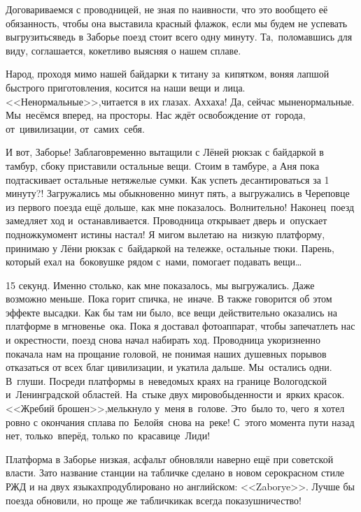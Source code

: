 Договариваемся с проводницей, не зная по наивности, что это вообще\sdash то её обязанность, чтобы она выставила красный флажок, если мы будем не успевать выгрузиться\mdash ведь в Заборье поезд стоит всего одну минуту. Та,~поломавшись для виду, соглашается, кокетливо выясняя о нашем сплаве. 

Народ, проходя мимо нашей байдарки к титану за~кипятком, воняя лапшой быстрого приготовления, косится на наши вещи и лица.  <<Ненормальные>>,\mdash читается в их глазах. Ах\sdash ха\sdash ха! Да, сейчас мы\mdash ненормальные. Мы~несёмся вперед, на просторы. Нас ждёт освобождение от~города, от~цивилизации, от~самих~себя.

И вот, Заборье! Заблаговременно вытащили с Лёней рюкзак с байдаркой в тамбур, сбоку приставили остальные вещи. Стоим в тамбуре, а Аня пока подтаскивает остальные нетяжелые сумки. Как успеть десантироваться за 1 минуту?! Загружались мы обыкновенно минут пять, а выгружались в Череповце из первого поезда ещё дольше, как мне показалось. Волнительно! Наконец~поезд замедляет ход и~останавливается. Проводница открывает дверь и~опускает подножку\mdash момент истины настал! Я мигом вылетаю на~низкую платформу, принимаю у Лёни рюкзак с~байдаркой на тележке, остальные тюки. Парень, который ехал на~боковушке рядом с~нами, помогает подавать вещи\ldots~

15 секунд. Именно столько, как мне показалось, мы выгружались. Даже возможно меньше. Пока горит спичка, не~иначе. В \cite{Квадригин} также говорится об этом эффекте высадки. Как бы там ни было, все вещи действительно оказались на платформе в мгновенье~ока. Пока я доставал фотоаппарат, чтобы запечатлеть нас и окрестности, поезд снова начал набирать ход. Проводница укоризненно покачала нам на прощание головой, не понимая наших душевных порывов отказаться от всех благ цивилизации, и укатила дальше. Мы~остались одни. В~глуши. Посреди платформы в~неведомых краях на границе Вологодской и~Ленинградской областей. На~стыке двух миров\mdash обыденности и~ярких красок. <<Жребий брошен>>,\mdash мелькнуло у~меня в~голове. Это~было то, чего~я хотел ровно с окончания сплава по~Белой\mdash я~снова на~реке! С~этого момента пути назад нет, только~вперёд, только по~красавице~Лиди!

Платформа в Заборье низкая, асфальт обновляли наверно ещё при советской власти. Зато название станции на табличке сделано в новом серо\sdash красном стиле РЖД и на двух языках\mdash продублировано но английском: <<Zaborye>>. Лучше бы поезда обновили, но проще же таблички\mdash как всегда показушничество! 

